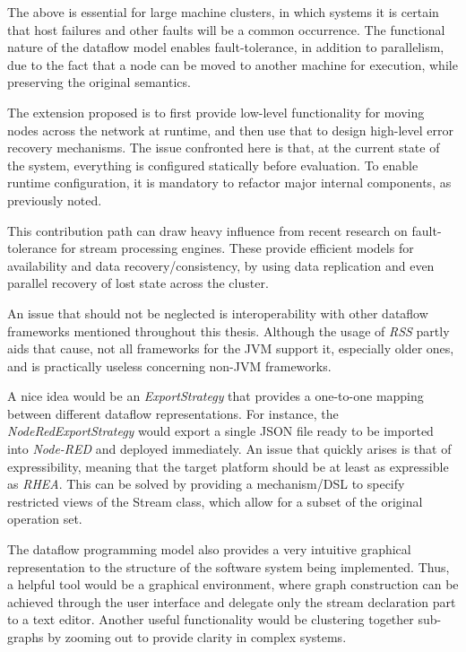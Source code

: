\documentclass{dithesis}
\begin{document}
The above is essential for large machine clusters, in which systems it is certain that host failures and other faults will be a common occurrence. The functional nature of the dataflow model enables fault-tolerance, in addition to parallelism, due to the fact that a node can be moved to another machine for execution, while preserving the original semantics.

The extension proposed is to first provide low-level functionality for moving nodes across the network at runtime, and then use that to design high-level error recovery mechanisms. The issue confronted here is that, at the current state of the system, everything is configured statically before evaluation. To enable runtime configuration, it is mandatory to refactor major internal components, as previously noted.

This contribution path can draw heavy influence from recent research on fault-tolerance for stream processing engines\cite{borealis,dstreams,wide_area}. These provide efficient models for availability and data recovery/consistency, by using data replication and even parallel recovery of lost state across the cluster.


An issue that should not be neglected is interoperability with other dataflow frameworks mentioned throughout this thesis. Although the usage of \textit{RSS} partly aids that cause, not all frameworks for the JVM support it, especially older ones, and is practically useless concerning non-JVM frameworks.

A nice idea would be an \textit{ExportStrategy} that provides a one-to-one mapping between different dataflow representations. For instance, the \textit{NodeRedExportStrategy} would export a single JSON file ready to be imported into \textit{Node-RED} and deployed immediately. An issue that quickly arises is that of expressibility, meaning that the target platform should be at least as expressible as \textit{RHEA}. This can be solved by providing a mechanism/DSL to specify restricted views of the Stream class, which allow for a subset of the original operation set. 


The dataflow programming model also provides a very intuitive graphical representation to the structure of the software system being implemented. Thus, a helpful tool would be a graphical environment, where graph construction can be achieved through the user interface and delegate only the stream declaration part to a text editor. Another useful functionality would be clustering together sub-graphs by zooming out to provide clarity in complex systems.
\end{document}
